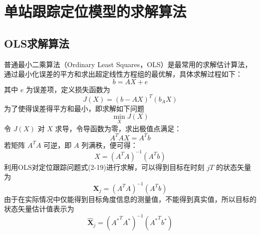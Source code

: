 \chapter{单站跟踪定位模型的求解算法}

\section{OLS求解算法}
普通最小二乘算法（Ordinary Least Squares，OLS）是最常用的求解估计算法，通过最小化误差的平方和求出超定线性方程组的最优解，具体求解过程如下：
\begin{equation}
	b = AX + e
\end{equation}
其中 $e$ 为误差项，定义损失函数为
\begin{equation}
	J(X) = (b-AX)^T (b_AX)
\end{equation}
为了使得误差得平方和最小，即求解如下问题
\begin{equation}
	\min_{X} J(X)
\end{equation}
令 $J(X)$ 对 $X$ 求导，令导函数为零，求出极值点满足：
\begin{equation}
	A^T AX = A^T b
\end{equation}
若矩阵 $A^TA$ 可逆，即 $A$ 列满秩，便可得：
\begin{equation}
	X = (A^TA)^{-1}(A^Tb)
\end{equation}
利用OLS对定位跟踪问题式(2-19)进行求解，可以得到目标在时刻 $jT$ 的状态矢量为
\begin{equation}
	\bm{X}_j = (A^TA)^{-1}(A^Tb)
\end{equation}
由于在实际情况中仅能得到目标角度信息的测量值，不能得到真实值，所以目标的状态矢量估计值表示为
\begin{equation}
	\hat{\bm{X}}_j = ({A^*}^TA^*)^{-1}({A^*}^Tb^*)	
\end{equation}
